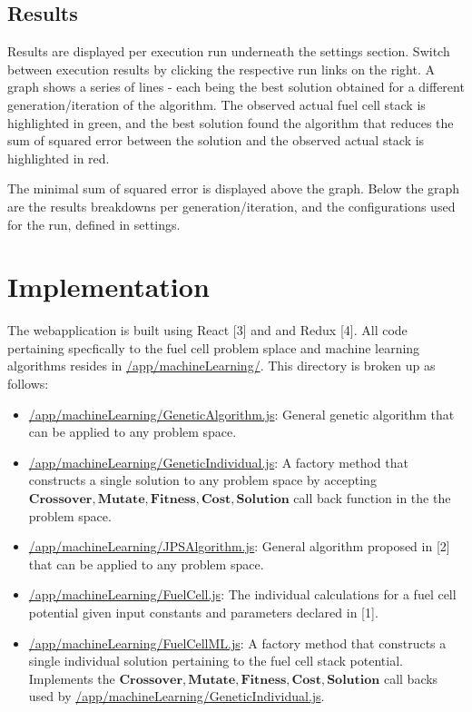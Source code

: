 \documentclass{article}
\newcommand{\Crossover}{\textbf{Crossover}}
\newcommand{\Mutate}{\textbf{Mutate}}
\newcommand{\Fitness}{\textbf{Fitness}}
\newcommand{\Cost}{\textbf{Cost}}
\newcommand{\Solution}{\textbf{Solution}}
\begin{document}
\subsection{Results}
Results are displayed per execution run underneath the settings section. Switch between execution results by clicking the respective run links on the right. A graph shows a series of lines - each being the best solution obtained for a different generation/iteration of the algorithm. The observed actual fuel cell stack is highlighted in green, and the best solution found the algorithm that reduces the sum of squared error between the solution and the observed actual stack is highlighted in red. 

The minimal sum of squared error is displayed above the graph. Below the graph are the results breakdowns per generation/iteration, and the configurations used for the run, defined in settings.

\section{Implementation}
The webapplication is built using React [3] and and Redux [4]. All code pertaining specfically to the fuel cell problem splace and machine learning algorithms resides in \url{/app/machineLearning/}. This directory is broken up as follows:

\begin{itemize}
    \item \url{/app/machineLearning/GeneticAlgorithm.js}: General genetic algorithm that can be applied to any problem space.
    \item \url{/app/machineLearning/GeneticIndividual.js}: A factory method that constructs a single solution to any problem space by accepting $\Crossover, \Mutate, \Fitness, \Cost, \Solution$ call back function in the the problem space.
    \item \url{/app/machineLearning/JPSAlgorithm.js}: General algorithm proposed in [2] that can be applied to any problem space.
    \item \url{/app/machineLearning/FuelCell.js}: The individual calculations for a fuel cell potential given input constants and parameters declared in [1].
    \item \url{/app/machineLearning/FuelCellML.js}: A factory method that constructs a single individual solution pertaining to the fuel cell stack potential. Implements the $\Crossover, \Mutate, \Fitness, \Cost, \Solution$ call backs used by \url{/app/machineLearning/GeneticIndividual.js}. 
\end{itemize}
\end{document}
